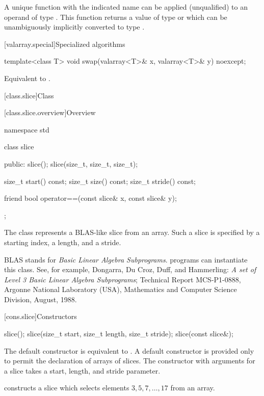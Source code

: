 \begin{itemdescr}
\pnum
\mandates
A unique function with the indicated name can be applied (unqualified)
to an operand of type .
This function returns a value of type 
or which can be unambiguously implicitly converted to type .
\end{itemdescr}

[valarray.special]{Specialized algorithms}

%
\begin{itemdecl}
template<class T> void swap(valarray<T>& x, valarray<T>& y) noexcept;
\end{itemdecl}

\begin{itemdescr}
\pnum
\effects
Equivalent to .
\end{itemdescr}

[class.slice]{Class }

[class.slice.overview]{Overview}

%
\begin{codeblock}
namespace std {
  class slice {
  public:
    slice();
    slice(size_t, size_t, size_t);

    size_t start() const;
    size_t size() const;
    size_t stride() const;

    friend bool operator==(const slice& x, const slice& y);
  };
}
\end{codeblock}

\pnum
The 
class represents a BLAS-like slice from an array.
Such a slice is specified by a starting index, a length, and a
stride.
\begin{footnote}
BLAS stands for
\textit{Basic Linear Algebra Subprograms}.
\Cpp{} programs can instantiate this class.
See, for example,
Dongarra, Du Croz, Duff, and Hammerling:
\textit{A set of Level 3 Basic Linear Algebra Subprograms};
Technical Report MCS-P1-0888,
Argonne National Laboratory (USA),
Mathematics and Computer Science Division,
August, 1988.
\end{footnote}

[cons.slice]{Constructors}

%
\begin{itemdecl}
slice();
slice(size_t start, size_t length, size_t stride);
slice(const slice&);
\end{itemdecl}

\begin{itemdescr}
\pnum
The default constructor is equivalent to .
A default constructor is provided only to permit the declaration of arrays of slices.
The constructor with arguments for a slice takes a start, length, and stride
parameter.

\pnum
\begin{example}
constructs a slice which selects elements $3, 5, 7, \dotsc, 17$ from an array.
\end{example}
\end{itemdescr}

